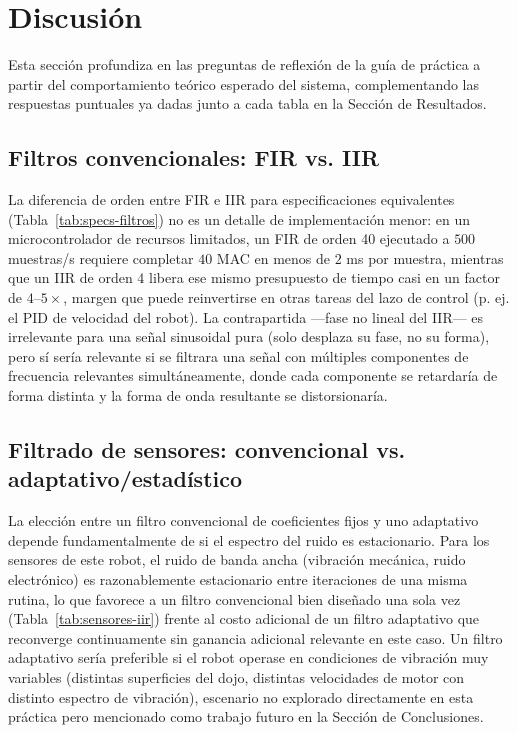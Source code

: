 
\section{Discusión}

Esta sección profundiza en las preguntas de reflexión de la guía de práctica a partir del comportamiento teórico esperado del sistema, complementando las respuestas puntuales ya dadas junto a cada tabla en la Sección de Resultados.

\subsection{Filtros convencionales: FIR vs. IIR}

La diferencia de orden entre FIR e IIR para especificaciones equivalentes (Tabla~\ref{tab:specs-filtros}) no es un detalle de implementación menor: en un microcontrolador de recursos limitados, un FIR de orden 40 ejecutado a $500$ muestras/s requiere completar $40$ MAC en menos de $2$ ms por muestra, mientras que un IIR de orden $4$ libera ese mismo presupuesto de tiempo casi en un factor de $4$--$5\times$, margen que puede reinvertirse en otras tareas del lazo de control (p. ej. el PID de velocidad del robot). La contrapartida —fase no lineal del IIR— es irrelevante para una señal sinusoidal pura (solo desplaza su fase, no su forma), pero sí sería relevante si se filtrara una señal con múltiples componentes de frecuencia relevantes simultáneamente, donde cada componente se retardaría de forma distinta y la forma de onda resultante se distorsionaría.

\subsection{Filtrado de sensores: convencional vs. adaptativo/estadístico}

La elección entre un filtro convencional de coeficientes fijos y uno adaptativo depende fundamentalmente de si el espectro del ruido es estacionario. Para los sensores de este robot, el ruido de banda ancha (vibración mecánica, ruido electrónico) es razonablemente estacionario entre iteraciones de una misma rutina, lo que favorece a un filtro convencional bien diseñado una sola vez (Tabla~\ref{tab:sensores-iir}) frente al costo adicional de un filtro adaptativo que reconverge continuamente sin ganancia adicional relevante en este caso. Un filtro adaptativo sería preferible si el robot operase en condiciones de vibración muy variables (distintas superficies del dojo, distintas velocidades de motor con distinto espectro de vibración), escenario no explorado directamente en esta práctica pero mencionado como trabajo futuro en la Sección de Conclusiones.

